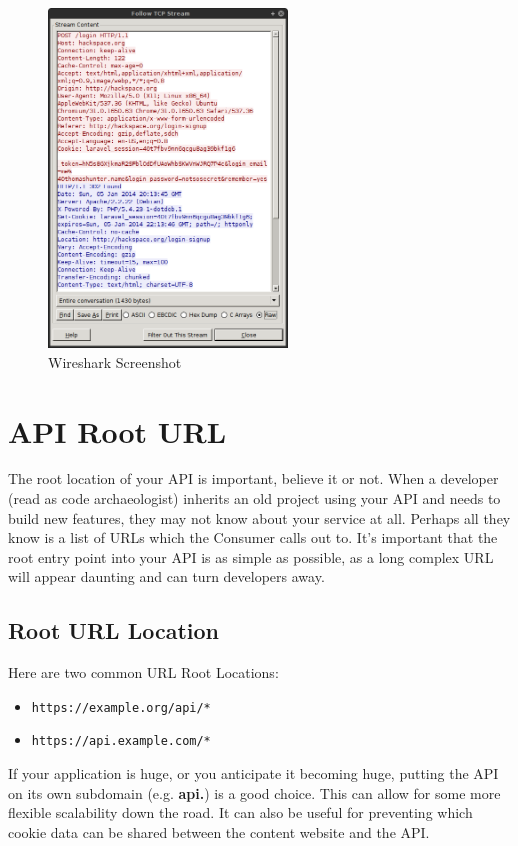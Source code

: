 \documentclass{book}
\begin{document}
\begin{figure}[ht!]
\centering
\includegraphics[height=90mm]{images/wireshark.png}
\caption{Wireshark Screenshot}
\label{overflow}
\end{figure}


\chapter{API Root URL}

The root location of your API is important, believe it or not. When a developer (read as code archaeologist) inherits an old project using your API and needs to build new features, they may not know about your service at all. Perhaps all they know is a list of URLs which the Consumer calls out to. It's important that the root entry point into your API is as simple as possible, as a long complex URL will appear daunting and can turn developers away.

\section{Root URL Location}

Here are two common URL Root Locations:

\begin{itemize}
\item \texttt{https://example.org/api/*}
\item \texttt{https://api.example.com/*}
\end{itemize}

If your application is huge, or you anticipate it becoming huge, putting the API on its own subdomain (e.g. \textbf{api.}) is a good choice. This can allow for some more flexible scalability down the road. It can also be useful for preventing which cookie data can be shared between the content website and the API.
\end{document}
